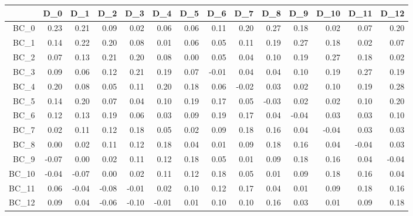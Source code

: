 \documentclass[10pt,a4paper]{article}\usepackage[]{graphicx}\usepackage[]{color}
\begin{document}
\begin{table}[ht]
\centering
\begin{tabular}{rrrrrrrrrrrrrr}
  \hline
 & D\_0 & D\_1 & D\_2 & D\_3 & D\_4 & D\_5 & D\_6 & D\_7 & D\_8 & D\_9 & D\_10 & D\_11 & D\_12 \\ 
  \hline
BC\_0 & 0.23 & 0.21 & 0.09 & 0.02 & 0.06 & 0.06 & 0.11 & 0.20 & 0.27 & 0.18 & 0.02 & 0.07 & 0.20 \\ 
  BC\_1 & 0.14 & 0.22 & 0.20 & 0.08 & 0.01 & 0.06 & 0.05 & 0.11 & 0.19 & 0.27 & 0.18 & 0.02 & 0.07 \\ 
  BC\_2 & 0.07 & 0.13 & 0.21 & 0.20 & 0.08 & 0.00 & 0.05 & 0.04 & 0.10 & 0.19 & 0.27 & 0.18 & 0.02 \\ 
  BC\_3 & 0.09 & 0.06 & 0.12 & 0.21 & 0.19 & 0.07 & -0.01 & 0.04 & 0.04 & 0.10 & 0.19 & 0.27 & 0.19 \\ 
  BC\_4 & 0.20 & 0.08 & 0.05 & 0.11 & 0.20 & 0.18 & 0.06 & -0.02 & 0.03 & 0.02 & 0.10 & 0.19 & 0.28 \\ 
  BC\_5 & 0.14 & 0.20 & 0.07 & 0.04 & 0.10 & 0.19 & 0.17 & 0.05 & -0.03 & 0.02 & 0.02 & 0.10 & 0.20 \\ 
  BC\_6 & 0.12 & 0.13 & 0.19 & 0.06 & 0.03 & 0.09 & 0.19 & 0.17 & 0.04 & -0.04 & 0.03 & 0.03 & 0.10 \\ 
  BC\_7 & 0.02 & 0.11 & 0.12 & 0.18 & 0.05 & 0.02 & 0.09 & 0.18 & 0.16 & 0.04 & -0.04 & 0.03 & 0.03 \\ 
  BC\_8 & 0.00 & 0.02 & 0.11 & 0.12 & 0.18 & 0.04 & 0.01 & 0.09 & 0.18 & 0.16 & 0.04 & -0.04 & 0.03 \\ 
  BC\_9 & -0.07 & 0.00 & 0.02 & 0.11 & 0.12 & 0.18 & 0.05 & 0.01 & 0.09 & 0.18 & 0.16 & 0.04 & -0.04 \\ 
  BC\_10 & -0.04 & -0.07 & 0.00 & 0.02 & 0.11 & 0.12 & 0.18 & 0.05 & 0.01 & 0.09 & 0.18 & 0.16 & 0.04 \\ 
  BC\_11 & 0.06 & -0.04 & -0.08 & -0.01 & 0.02 & 0.10 & 0.12 & 0.17 & 0.04 & 0.01 & 0.09 & 0.18 & 0.16 \\ 
  BC\_12 & 0.09 & 0.04 & -0.06 & -0.10 & -0.01 & 0.01 & 0.10 & 0.10 & 0.16 & 0.03 & 0.01 & 0.09 & 0.18 \\ 
   \hline
\end{tabular}
\end{table}
\end{document}
